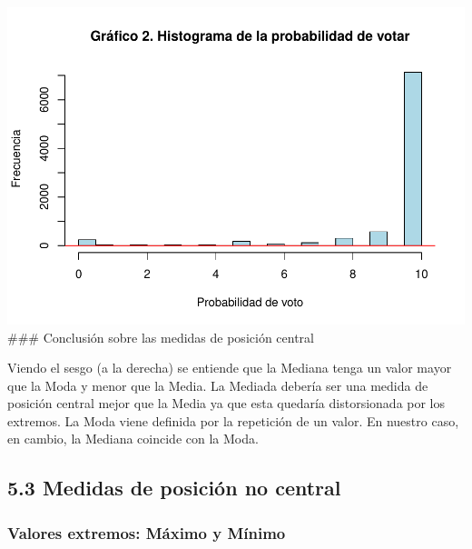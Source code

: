 \documentclass[
]{article}
\newenvironment{Shaded}{\begin{snugshade}}{\end{snugshade}}
\newcommand{\AttributeTok}[1]{\textcolor[rgb]{0.13,0.29,0.53}{#1}}
\newcommand{\ConstantTok}[1]{\textcolor[rgb]{0.56,0.35,0.01}{#1}}
\newcommand{\FunctionTok}[1]{\textcolor[rgb]{0.13,0.29,0.53}{\textbf{#1}}}
\newcommand{\NormalTok}[1]{#1}
\newcommand{\OtherTok}[1]{\textcolor[rgb]{0.56,0.35,0.01}{#1}}
\newcommand{\SpecialCharTok}[1]{\textcolor[rgb]{0.81,0.36,0.00}{\textbf{#1}}}
\begin{document}
\includegraphics{probabilidadVoto_files/figure-latex/histograma-1.pdf}
\#\#\# Conclusión sobre las medidas de posición central

Viendo el sesgo (a la derecha) se entiende que la Mediana tenga un valor
mayor que la Moda y menor que la Media. La Mediada debería ser una
medida de posición central mejor que la Media ya que esta quedaría
distorsionada por los extremos. La Moda viene definida por la repetición
de un valor. En nuestro caso, en cambio, la Mediana coincide con la
Moda.

\hypertarget{medidas-de-posiciuxf3n-no-central}{%
\subsection{5.3 Medidas de posición no
central}\label{medidas-de-posiciuxf3n-no-central}}

\hypertarget{valores-extremos-muxe1ximo-y-muxednimo}{%
\subsubsection{Valores extremos: Máximo y
Mínimo}\label{valores-extremos-muxe1ximo-y-muxednimo}}

\begin{Shaded}
\end{Shaded}
\end{document}
